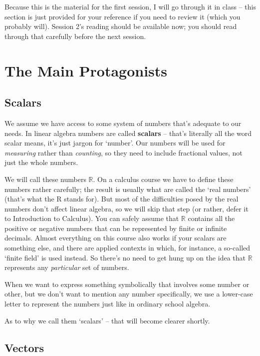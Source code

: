 \documentclass[oneside,english]{amsbook}
\numberwithin{section}{chapter}
\theoremstyle{plain}
\theoremstyle{definition}
\begin{document}
Because this is the material for the first session, I will go through it
in class -- this section is just provided for your reference if you need
to review it (which you probably will). Session 2's reading should be
available now; you should read through that carefully before the next
session.

\section{The Main Protagonists}

\subsection{Scalars}

We assume we have access to some system of numbers that's adequate to
our needs. In linear algebra numbers are called \textbf{scalars} --
that's literally all the word scalar means, it's just jargon for
`number'. Our numbers will be used for \emph{measuring} rather than
\emph{counting}, so they need to include fractional values, not just the
whole numbers.

We will call these numbers $\mathbb{R}$. On a calculus course we have to
define these numbers rather carefully; the result is usually what are
called the `real numbers' (that's what the R stands for). But most of
the difficulties posed by the real numbers don't affect linear algebra,
so we will skip that step (or rather, defer it to Introduction to
Calculus). You can safely assume that $\mathbb{R}$ contains all the
positive or negative numbers that can be represented by finite or
infinite decimals. Almost everything on this course also works if your scalars are
something else, and there are applied contexts in which, for instance, a
so-called `finite field' is used instead. So there's no need to get
hung up on the idea that $\mathbb{R}$ represents any \emph{particular} set
of numbers.

When we want to express something symbolically that involves some number
or other, but we don't want to mention any number specifically, we use a
lower-case letter to represent the numbers just like in ordinary school
algebra.

As to why we call them `scalars' -- that will become clearer shortly.

\subsection{Vectors}
\end{document}
